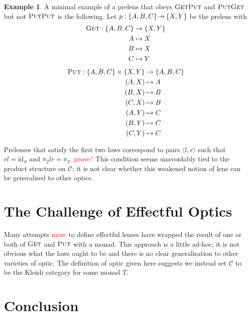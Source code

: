 \documentclass[11pt,a4paper]{article}
\theoremstyle{plain}
\theoremstyle{definition}
\newtheorem{example}[theorem]{Example}
\newcommand{\C}{\mathscr{C}}
\newcommand{\id}{\mathrm{id}}
\newcommand{\fget}{\textsc{Get}}
\newcommand{\fput}{\textsc{Put}}
\newcommand{\hto}{\ensuremath{\,\mathaccent\shortmid\rightarrow\,}}
\newcommand{\todo}[1]{\textcolor{red}{\small #1}}
\begin{document}
\begin{example}
A minimal example of a prelens that obeys $\fget\fput$ and $\fput\fget$ but not $\fput\fput$ is the following. Let $p : \{A,B,C\} \hto \{X, Y\}$ be the prelens with
\begin{align*}
\fget : \{A,B,C\} &\to \{X, Y\} \\
A &\mapsto X \\
B &\mapsto X \\
C &\mapsto Y 
\end{align*}
\begin{align*}
\fput : \{A,B,C\} \times \{X, Y\} &\to \{A,B,C\} \\
(A,X) &\mapsto A \\
(B,X) &\mapsto B \\
(C,X) &\mapsto B \\
(A,Y) &\mapsto C \\
(B,Y) &\mapsto C \\
(C,Y) &\mapsto C
\end{align*}
\end{example}

Prelenses that satisfy the first two laws correspond to pairs $\langle l, r \rangle$ such that $rl = \id_S$ and $\pi_2lr = \pi_2$. \todo{prove?} This condition seems unavoidably tied to the product structure on $\C$; it is not clear whether this weakened notion of lens can be generalised to other optics.

\section{The Challenge of Effectful Optics}

Many attempts \cite{ReflectionsOnMonadicLenses} \todo{more} to define effectful lenses have wrapped the result of one or both of $\fget$ and $\fput$ with a monad. This approach is a little ad-hoc; it is not obvious what the laws ought to be and there is no clear generalisation to other varieties of optic. The definition of optic given here suggests we instead set $\C$ to be the Kleisli category for some monad $T$.

\section{Conclusion}



\end{document}
